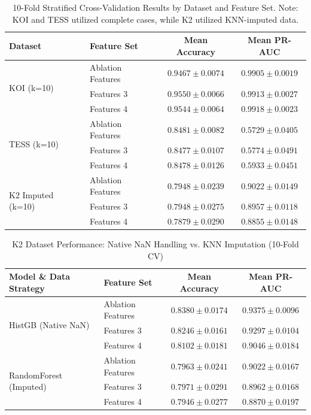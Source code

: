 \documentclass{article}
\begin{document}
\begin{table}[h]
\centering
\caption{10-Fold Stratified Cross-Validation Results by Dataset and Feature Set. Note: KOI and TESS utilized complete cases, while K2 utilized KNN-imputed data.}
\label{tab:cv_results_full}
\begin{tabular}{llcc}
\toprule
\textbf{Dataset} & \textbf{Feature Set} & \textbf{Mean Accuracy} & \textbf{Mean PR-AUC} \\
\midrule
\multirow{3}{*}{KOI (k=10)}
& Ablation Features & $0.9467 \pm 0.0074$ & $0.9905 \pm 0.0019$ \\
& Features 3 & $0.9550 \pm 0.0066$ & $0.9913 \pm 0.0027$ \\
& Features 4 & $0.9544 \pm 0.0064$ & $0.9918 \pm 0.0023$ \\
\midrule
\multirow{3}{*}{TESS (k=10)}
& Ablation Features & $0.8481 \pm 0.0082$ & $0.5729 \pm 0.0405$ \\
& Features 3 & $0.8477 \pm 0.0107$ & $0.5774 \pm 0.0491$ \\
& Features 4 & $0.8478 \pm 0.0126$ & $0.5933 \pm 0.0451$ \\
\midrule
\multirow{3}{*}{K2 Imputed (k=10)}
& Ablation Features & $0.7948 \pm 0.0239$ & $0.9022 \pm 0.0149$ \\
& Features 3 & $0.7948 \pm 0.0275$ & $0.8957 \pm 0.0118$ \\
& Features 4 & $0.7879 \pm 0.0290$ & $0.8855 \pm 0.0148$ \\
\bottomrule
\end{tabular}
\end{table}


\begin{table}[h]
\centering
\caption{K2 Dataset Performance: Native NaN Handling vs. KNN Imputation (10-Fold CV)}
\label{tab:k2_missing_data}
\begin{tabular}{llcc}
\toprule
\textbf{Model \& Data Strategy} & \textbf{Feature Set} & \textbf{Mean Accuracy} & \textbf{Mean PR-AUC} \\
\midrule
\multirow{3}{*}{HistGB (Native NaN)}
& Ablation Features & $0.8380 \pm 0.0174$ & $0.9375 \pm 0.0096$ \\
& Features 3 & $0.8246 \pm 0.0161$ & $0.9297 \pm 0.0104$ \\
& Features 4 & $0.8102 \pm 0.0181$ & $0.9046 \pm 0.0184$ \\
\midrule
\multirow{3}{*}{RandomForest (Imputed)}
& Ablation Features & $0.7963 \pm 0.0241$ & $0.9022 \pm 0.0167$ \\
& Features 3 & $0.7971 \pm 0.0291$ & $0.8962 \pm 0.0168$ \\
& Features 4 & $0.7946 \pm 0.0277$ & $0.8870 \pm 0.0197$ \\
\bottomrule
\end{tabular}
\end{table}
\end{document}
